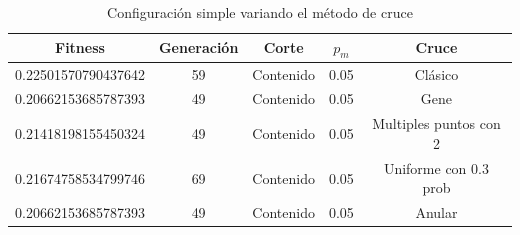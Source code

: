 \documentclass{sig-alternate}
\begin{document}
\begin{table}[htp]
	\begin{center}
	\begin{tabular}{|c|c|c|c|c|}
		\hline
	     Fitness & Generación & Corte & $p_{m}$ & Cruce \\
		\hline
		0.22501570790437642 & 59 & Contenido & 0.05 & Clásico \\
		0.20662153685787393 & 49 & Contenido & 0.05 & Gene \\
		0.21418198155450324 & 49 & Contenido & 0.05 & Multiples puntos con 2 \\
		0.21674758534799746 & 69 & Contenido & 0.05 & Uniforme con 0.3 prob \\
		0.20662153685787393 & 49 & Contenido & 0.05 & Anular \\
		\hline
	\end{tabular}
	\caption{Configuración simple variando el método de cruce}
	\label{table:simple_mutation_prob} 
	\end{center}
\end{table}
\end{document}
